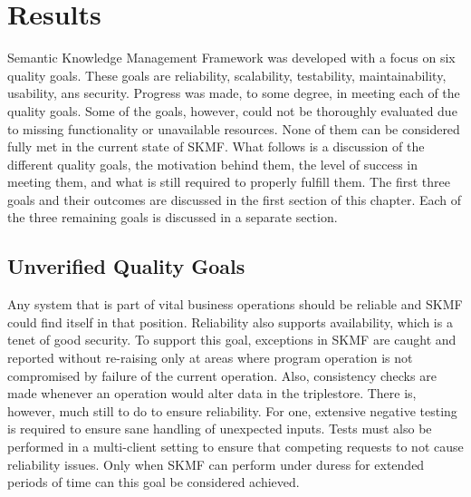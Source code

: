 \chapter{Results}
\label{result}

Semantic Knowledge Management Framework was developed with a focus on six quality goals. These goals are reliability, scalability, testability, maintainability, usability, ans security. Progress was made, to some degree, in meeting each of the quality goals. Some of the goals, however, could not be thoroughly evaluated due to missing functionality or unavailable resources. None of them can be considered fully met in the current state of SKMF. What follows is a discussion of the different quality goals, the motivation behind them, the level of success in meeting them, and what is still required to properly fulfill them. The first three goals and their outcomes are discussed in the first section of this chapter. Each of the three remaining goals is discussed in a separate section.


\section{Unverified Quality Goals}
\label{result:unverified}

Any system that is part of vital business operations should be reliable and SKMF could find itself in that position. Reliability also supports availability, which is a tenet of good security. To support this goal, exceptions in SKMF are caught and reported without re-raising only at areas where program operation is not compromised by failure of the current operation. Also, consistency checks are made whenever an operation would alter data in the triplestore. There is, however, much still to do to ensure reliability. For one, extensive negative testing is required to ensure sane handling of unexpected inputs. Tests must also be performed in a multi-client setting to ensure that competing requests to not cause reliability issues. Only when SKMF can perform under duress for extended periods of time can this goal be considered achieved.

